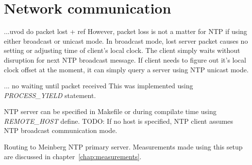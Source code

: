 
\section{Network communication}
...uvod do packet lost + ref
However, packet loss is not a matter for NTP if using either broadcast or unicast mode.
In broadcast mode, lost server packet causes no setting or adjusting time of client's
local clock.
The client simply waits without disruption for next NTP broadcast message.
If client needs to figure out it's local clock offset at the moment,
it can simply query a server using NTP unicast mode.

... no waiting until packet received
This was implemented using {\it{PROCESS\_YIELD}} statement.

NTP server can be specified in Makefile or
during compilate time using {\it{REMOTE\_HOST}} define.
TODO: If no host is specified,
NTP client assumes NTP broadcast communication mode.




Routing to Meinberg NTP primary server.
Measurements made using this setup are discussed in chapter~\ref{chap:measurements}.
